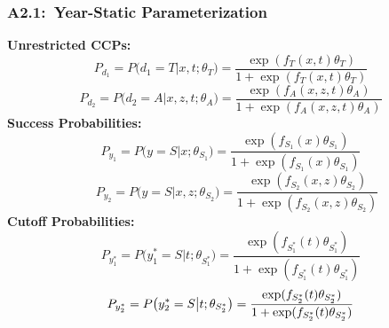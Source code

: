 \documentclass[12pt, aspectratio=169]{beamer}
\begin{document}
\begin{frame}[label=ysp]
\frametitle{A2.1:\ Year-Static Parameterization}
\textbf{Unrestricted CCPs:}
\vspace{-5pt}
\footnotesize
\begin{equation*}
P_{d_1} = P\big(d_1=T\big|x,t;\theta_T\big) = \frac{\exp(f_T(x,t)\theta_T)}{1+\exp(f_T(x,t)\theta_T)}
\end{equation*}
\begin{equation*}
P_{d_2} = P\big(d_2=A\big|x,z,t;\theta_A\big) = \frac{\exp(f_A(x,z,t)\theta_A)}{1+\exp(f_A(x,z,t)\theta_A)}
\end{equation*}
\normalsize
\textbf{Success Probabilities:}
\vspace{-5pt}
\footnotesize
\begin{equation*}
P_{y_1} = P\big(y = S\big|x;\theta_{S_1}\big) = \frac{\exp(f_{S_1}(x)\theta_{S_1})}{1+\exp(f_{S_1}(x)\theta_{S_1})}
\end{equation*}
\begin{equation*}
\quad P_{y_2} = P\big(y = S\big|x,z;\theta_{S_2}\big) = \frac{\exp(f_{S_2}(x,z)\theta_{S_2})}{1+\exp(f_{S_2}(x,z)\theta_{S_2})}
\end{equation*}
\normalsize
\textbf{Cutoff Probabilities:}
\vspace{-5pt}
\footnotesize
\begin{equation*}
P_{y_1^*} = P\big(y_1^* = S\big|t;\theta_{S_1^*}\big) = \frac{\exp(f_{S_1^*}(t)\theta_{S_1^*})}{1+\exp(f_{S_1^*}(t)\theta_{S_1^*})}
\end{equation*}
\begin{equation*}
P_{y_2^*} = P\big(y_2^* = S\big|t;\theta_{S_2^*}\big) = \frac{\exp(f_{S_2^*}(t)\theta_{S_2^*})}{1+\exp(f_{S_2^*}(t)\theta_{S_2^*})}
\vspace{-5pt}
\end{equation*}
\hyperlink{ysm}{}
\end{frame}
\end{document}
